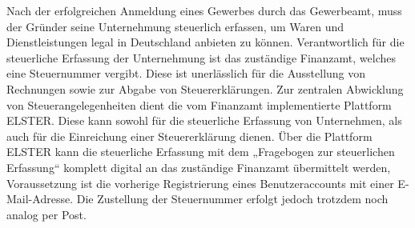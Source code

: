 Nach der erfolgreichen Anmeldung eines Gewerbes durch das Gewerbeamt, muss der Gründer seine Unternehmung steuerlich erfassen, um Waren und Dienstleistungen legal in Deutschland anbieten zu können.
 Verantwortlich für die steuerliche Erfassung der Unternehmung ist das zuständige Finanzamt, welches eine Steuernummer vergibt. Diese ist unerlässlich für die Ausstellung von Rechnungen sowie zur Abgabe von Steuererklärungen. 
 Zur zentralen Abwicklung von Steuerangelegenheiten dient die vom Finanzamt implementierte Plattform ELSTER.
 Diese kann sowohl für die steuerliche Erfassung von Unternehmen, als auch für die Einreichung einer Steuererklärung dienen. 
 Über die Plattform ELSTER kann die steuerliche Erfassung mit dem „Fragebogen zur steuerlichen Erfassung“ komplett digital an das zuständige Finanzamt übermittelt werden, Voraussetzung ist die vorherige Registrierung eines Benutzeraccounts mit einer E-Mail-Adresse. 
 Die Zustellung der Steuernummer erfolgt jedoch trotzdem noch analog per Post. 
